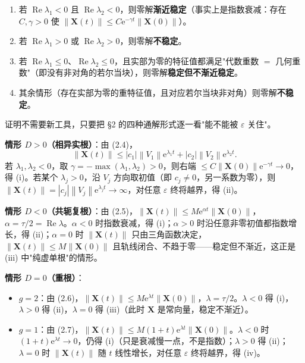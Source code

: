 \documentclass[11pt]{ctexart}
\newcommand{\X}{\mathbf{X}}\newcommand{\Y}{\mathbf{Y}}
\newcommand{\eps}{\varepsilon}
\newcommand{\abs}[1]{\left|#1\right|}
\newcommand{\norm}[1]{\left\lVert#1\right\rVert}
\begin{document}
\begin{enumerate}
\item[(i)] 若 $\operatorname{Re}\lambda_1<0$ 且 $\operatorname{Re}\lambda_2<0$，则零解\textbf{渐近稳定}（事实上是指数衰减：存在 $C,\gamma>0$ 使 $\norm{\X(t)}\le C\mathrm{e}^{-\gamma t}\norm{\X(0)}$）。
\item[(ii)] 若 $\operatorname{Re}\lambda_1>0$ 或 $\operatorname{Re}\lambda_2>0$，则零解\textbf{不稳定}。
\item[(iii)] 若 $\operatorname{Re}\lambda_1\le0$、$\operatorname{Re}\lambda_2\le0$，且实部为零的特征值都满足"代数重数 $=$ 几何重数"（即没有非对角的若尔当块），则零解\textbf{稳定但不渐近稳定}。
\item[(iv)] 其余情形（存在实部为零的重特征值，且对应若尔当块非对角）则零解\textbf{不稳定}。
\end{enumerate}


证明不需要新工具，只要把 §2 的四种通解形式逐一看"能不能被 $\eps$ 关住"。

\textbf{情形 $D>0$（相异实根）}：由 (2.4)，
\[
\norm{\X(t)}\le\abs{c_1}\norm{V_1}\mathrm{e}^{\lambda_1t}+\abs{c_2}\norm{V_2}\mathrm{e}^{\lambda_2t}.
\]
若 $\lambda_1,\lambda_2<0$，取 $\gamma=-\max(\lambda_1,\lambda_2)>0$，则右端 $\le C\norm{\X(0)}\mathrm{e}^{-\gamma t}\to0$，得 (i)。若某个 $\lambda_j>0$，沿 $V_j$ 方向取初值（即 $c_j\neq0$，另一系数为零），则 $\norm{\X(t)}=\abs{c_j}\norm{V_j}\mathrm{e}^{\lambda_jt}\to\infty$，对任意 $\eps$ 终将越界，得 (ii)。

\textbf{情形 $D<0$（共轭复根）}：由 (2.5)，$\norm{\X(t)}\le M\mathrm{e}^{\alpha t}\norm{\X(0)}$，$\alpha=\tau/2=\operatorname{Re}\lambda$。$\alpha<0$ 时指数衰减，得 (i)；$\alpha>0$ 时沿任意非零初值都指数增长，得 (ii)；$\alpha=0$ 时 $\norm{\X(t)}$ 只由三角函数决定，$\norm{\X(t)}\le M\norm{\X(0)}$ 且轨线闭合、不趋于零——稳定但不渐近，这正是 (iii) 中"纯虚单根"的情形。

\textbf{情形 $D=0$（重根）}：
\begin{itemize}
\item $g=2$：由 (2.6)，$\norm{\X(t)}\le M\mathrm{e}^{\lambda t}\norm{\X(0)}$，$\lambda=\tau/2$。$\lambda<0$ 得 (i)，$\lambda>0$ 得 (ii)，$\lambda=0$ 得 (iii)（此时 $\X$ 是常向量，稳定不渐近）。
\item $g=1$：由 (2.7)，$\norm{\X(t)}\le M(1+t)\mathrm{e}^{\lambda t}\norm{\X(0)}$。$\lambda<0$ 时 $(1+t)\mathrm{e}^{\lambda t}\to0$，仍得 (i)（只是衰减慢一点，不是指数）；$\lambda>0$ 得 (ii)；$\lambda=0$ 时 $\norm{\X(t)}$ 随 $t$ 线性增长，对任意 $\eps$ 终将越界，得 (iv)。
\end{itemize}
\end{document}
